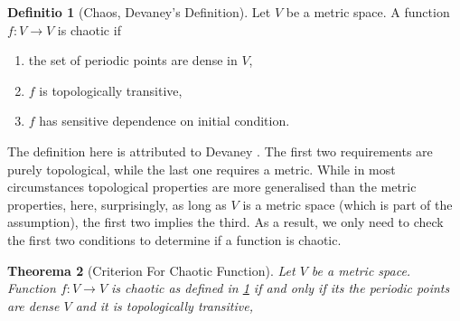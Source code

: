 \documentclass{report}
\newtheorem{thm}{Theorema}[chapter]
\theoremstyle{definition}
\newtheorem{defn}[thm]{Definitio}
\theoremstyle{definition}
\theoremstyle{remark}
\begin{document}
\begin{defn}[Chaos, Devaney's Definition]\label{def:Devaney_definition_for_chaos}
	Let $V$ be a metric space.
	A function $f: V \rightarrow V$ is chaotic if 
	\begin{enumerate}
		\item the set of periodic points are dense in $V$,
		\item $f$ is topologically transitive,
		\item $f$ has sensitive dependence on initial condition. 
	\end{enumerate}
	
\end{defn}


The definition here is attributed to Devaney \cite{Devaney_green_book_chaos_definition}. 
The first two requirements are purely topological, while the last one requires a metric. 
While in most circumstances topological properties are more generalised than the metric properties, here, surprisingly, as long as $V$ is a metric space (which is part of the assumption), the first two implies the third\cite{Banks}. 
As a result, we only need to check the first two conditions to determine if a function is chaotic.

\begin{thm}[Criterion For Chaotic Function]
	Let $V$ be a metric space. 
	Function $f: V \rightarrow V$ is chaotic as defined in \ref{def:Devaney_definition_for_chaos}
	if and only if its the periodic points are dense $V$ and it is topologically transitive,
\end{thm}

\end{document}
